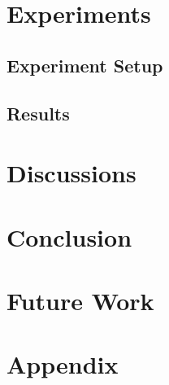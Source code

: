 \documentclass[]{article}
\begin{document}
\section{Experiments}

\subsection{Experiment Setup}

\subsection{Results}



\section{Discussions}



\section{Conclusion}



\section{Future Work}


\newpage




\newpage
\appendix
\section{Appendix}
\end{document}

